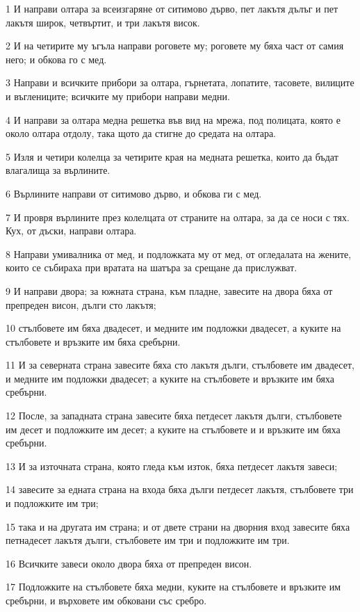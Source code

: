 \par 1 И направи олтара за всеизгаряне от ситимово дърво, пет лакътя дълъг и пет лакътя широк, четвъртит, и три лакътя висок.
\par 2 И на четирите му ъгъла направи роговете му; роговете му бяха част от самия него; и обкова го с мед.
\par 3 Направи и всичките прибори за олтара, гърнетата, лопатите, тасовете, вилиците и въглениците; всичките му прибори направи медни.
\par 4 И направи за олтара медна решетка във вид на мрежа, под полицата, която е около олтара отдолу, така щото да стигне до средата на олтара.
\par 5 Изля и четири колелца за четирите края на медната решетка, които да бъдат влагалища за върлините.
\par 6 Върлините направи от ситимово дърво, и обкова ги с мед.
\par 7 И провря върлините през колелцата от страните на олтара, за да се носи с тях. Кух, от дъски, направи олтара.
\par 8 Направи умивалника от мед, и подложката му от мед, от огледалата на жените, които се събираха при вратата на шатъра за срещане да прислужват.
\par 9 И направи двора; за южната страна, към пладне, завесите на двора бяха от препреден висон, дълги сто лакътя;
\par 10 стълбовете им бяха двадесет, и медните им подложки двадесет, а куките на стълбовете и връзките им бяха сребърни.
\par 11 И за северната страна завесите бяха сто лакътя дълги, стълбовете им двадесет, и медните им подложки двадесет; а куките на стълбовете и връзките им бяха сребърни.
\par 12 После, за западната страна завесите бяха петдесет лакътя дълги, стълбовете им десет и подложките им десет; а куките на стълбовете и и връзките им бяха сребърни.
\par 13 И за източната страна, която гледа към изток, бяха петдесет лакътя завеси;
\par 14 завесите за едната страна на входа бяха дълги петдесет лакътя, стълбовете три и подложките им три;
\par 15 така и на другата им страна; и от двете страни на дворния вход завесите бяха петнадесет лакътя дълги, стълбовете им три и подложките им три.
\par 16 Всичките завеси около двора бяха от препреден висон.
\par 17 Подложките на стълбовете бяха медни, куките на стълбовете и връзките им сребърни, и върховете им обковани със сребро.
